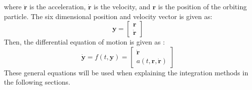 %
where $\ddot{\mathbf{r}}$ is the acceleration, $\dot{\mathbf{r}}$ is the velocity, and $\mathbf{r}$ is the position of the orbiting particle. The six dimensional position and velocity vector is given as:
\begin{equation}
\label{state_vec}
\mathbf{y}
=
\begin{bmatrix}
\mathbf{r} \\
\dot{\mathbf{r}}
\end{bmatrix}
\end{equation}
%
Then, the differential equation of motion is given as \cite{gillbook}:
\begin{equation}
\label{diff_eqn}
\dot{\mathbf{y}} = f(t,\mathbf{y}) =
\begin{bmatrix}
\dot{\mathbf{r}} \\
a(t, \mathbf{r}, \dot{\mathbf{r}})
\end{bmatrix}
\end{equation}
%
These general equations will be used when explaining the integration methods in the following sections.

